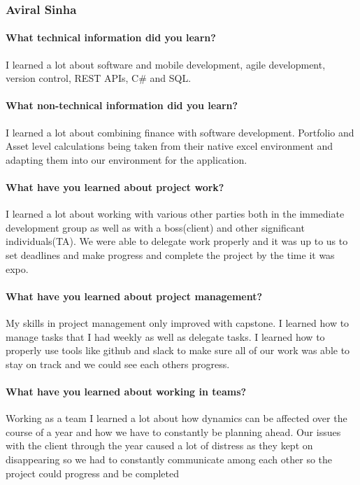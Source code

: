 \documentclass[onecolumn, draftclsnofoot,10pt, compsoc]{IEEEtran}
\begin{document}
\subsubsection{Aviral Sinha}

\paragraph{What technical information did you learn?} 
I learned a lot about software and mobile development, agile development, version control, REST APIs, C\# and SQL.

\paragraph{What non-technical information did you learn?} 
I learned a lot about combining finance with software development. Portfolio and Asset level calculations being taken from their native excel environment and adapting them into our environment for the application.

    
\paragraph{What have you learned about project work?} 
I learned a lot about working with various other parties both in the immediate development group as well as with a boss(client) and other significant individuals(TA). We were able to delegate work properly and it was up to us to set deadlines and make progress and complete the project by the time it was expo. 
    
\paragraph{What have you learned about project management?} 
My skills in project management only improved with capstone. I learned how to manage tasks that I had weekly as well as delegate tasks. I learned how to properly use tools like github and slack  to make sure all of our work was able to stay on track and we could see each others progress.
    
\paragraph{What have you learned about working in teams?}
Working as a team I learned a lot about how dynamics can be affected over the course of a year and how we have to constantly be planning ahead. Our issues with the client through the year caused a lot of distress as they kept on disappearing so we had to constantly communicate among each other so the project could progress and be completed 
    
\end{document}
